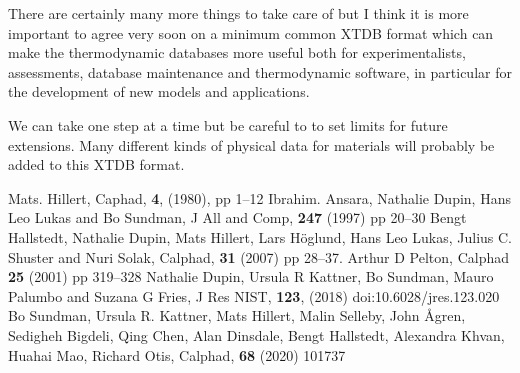\documentclass{article}
\begin{document}
There are certainly many more things to take care of but I think it is
more important to agree very soon on a minimum common XTDB format
which can make the thermodynamic databases more useful both for
experimentalists, assessments, database maintenance and thermodynamic
software, in particular for the development of new models and
applications.

We can take one step at a time but be careful to to set limits for
future extensions.  Many different kinds of physical data for
materials will probably be added to this XTDB format.

\begin{thebibliography}{00Zzzz}
 Mats. Hillert,  Caphad, {\bf 4}, (1980), pp 1--12
 Ibrahim. Ansara, Nathalie Dupin, Hans Leo Lukas and Bo Sundman,
  J All and Comp, {\bf 247} (1997) pp 20--30
 Bengt Hallstedt, Nathalie Dupin, Mats Hillert, Lars
  H{\"o}glund, Hans Leo Lukas, Julius C. Shuster and Nuri Solak,
  Calphad, {\bf 31} (2007) pp 28--37.
 Arthur D Pelton, Calphad {\bf 25} (2001) pp 319--328
 Nathalie Dupin, Ursula R Kattner, Bo Sundman, Mauro
  Palumbo and Suzana G Fries, J Res NIST, {\bf 123}, (2018)
  doi:10.6028/jres.123.020
 Bo Sundman, Ursula R. Kattner, Mats Hillert, Malin
  Selleby, John Ågren, Sedigheh Bigdeli, Qing Chen, Alan Dinsdale,
  Bengt Hallstedt, Alexandra Khvan, Huahai Mao, Richard Otis, Calphad,
  {\bf 68} (2020) 101737
\end{thebibliography}

\newpage 
\end{document}
